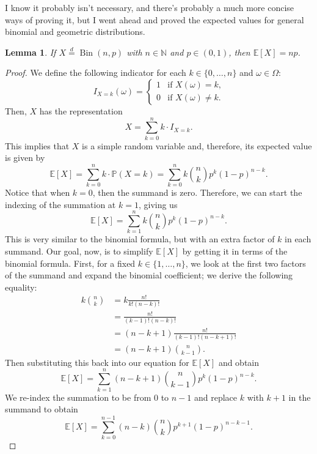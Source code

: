 \documentclass[12pt]{article}
\newtheorem{lemma}{Lemma}
\newcommand{\N}{\mathbb{N}} %
\renewcommand{\P}{\mathbb{P}} %
\newcommand{\E}{\mathbb{E}} %
\newcommand{\<}{\left\langle} %
\renewcommand{\>}{\right\rangle} %
\begin{document}
\newpage

I know it probably isn't necessary, and there's probably a much more concise ways of proving it, but I went ahead and proved the expected values for general binomial and geometric distributions.

\begin{lemma}
    If $X \overset{d}{=} \operatorname{Bin}(n, p)$ with $n\in\N$ and $p\in(0, 1)$, then $\E[X] = np$.
\end{lemma}

\begin{proof}
    We define the following indicator for each $k \in \{0, \dots, n\}$ and $\omega \in \Omega$:
    \[ I_{X=k}(\omega) = 
        \begin{cases}
            1 &\text{if $X(\omega) = k$,} \\
            0 &\text{if $X(\omega) \ne k$.}
        \end{cases}
    \]
    Then, $X$ has the representation
    \[X = \sum_{k = 0}^n k \cdot I_{X=k}.\]
    This implies that $X$ is a simple random variable and, therefore, its expected value is given by
    \[\E[X] = \sum_{k = 0}^n k \cdot \P(X = k) = \sum_{k = 0}^n k \binom{n}{k} p^k (1-p)^{n-k}.\]
    Notice that when $k = 0$, then the summand is zero. Therefore, we can start the indexing of the summation at $k = 1$, giving us
    \[\E[X] = \sum_{k = 1}^n k \binom{n}{k} p^k (1-p)^{n-k}.\]
    This is very similar to the binomial formula, but with an extra factor of $k$ in each summand. Our goal, now, is to simplify $\E[X]$ by getting it in terms of the binomial formula. First, for a fixed $k \in \{1, \dots, n\}$, we look at the first two factors of the summand and expand the binomial coefficient; we derive the following equality:
    \begin{align*}
        k \binom{n}{k}
            &= k \frac{n!}{k!(n - k)!} \\[1em]
            &= \frac{n!}{(k - 1)!(n - k)!} \\[1em]
            &= (n - k + 1) \frac{n!}{(k - 1)!(n - k + 1)!} \\[1em]
            &= (n - k + 1) \binom{n}{k - 1}.
    \end{align*}
    Then substituting this back into our equation for $\E[X]$ and obtain
    \[\E[X] = \sum_{k = 1}^n (n - k + 1) \binom{n}{k - 1} p^k (1-p)^{n - k}.\]
    We re-index the summation to be from $0$ to $n-1$ and replace $k$ with $k+1$ in the summand to obtain
    \[\E[X] = \sum_{k = 0}^{n - 1} (n - k) \binom{n}{k} p^{k + 1} (1-p)^{n - k - 1}.\]

\end{proof}
\end{document}
